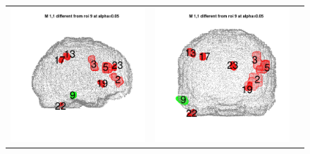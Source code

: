 \documentclass[12pt]{article}
\begin{document}
\begin{figure}[h]
\centering
\begin{tabular}{ccc}
\includegraphics[scale = 0.24]{../a7plots/d_1r_9_view1.png} & 
\includegraphics[scale = 0.24]{../a7plots/d_1r_9_view2.png} & 

\end{tabular}
\end{figure}
\end{document}
